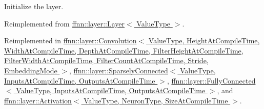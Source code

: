 Initialize the layer. 



Reimplemented from \hyperlink{classffnn_1_1layer_1_1_layer_ae8a7daa81382a7965b8ab8861da7e522}{ffnn\-::layer\-::\-Layer$<$ Value\-Type $>$}.



Reimplemented in \hyperlink{classffnn_1_1layer_1_1_convolution_a158af9a753113ac55730abd7b56b8684}{ffnn\-::layer\-::\-Convolution$<$ Value\-Type, Height\-At\-Compile\-Time, Width\-At\-Compile\-Time, Depth\-At\-Compile\-Time, Filter\-Height\-At\-Compile\-Time, Filter\-Width\-At\-Compile\-Time, Filter\-Count\-At\-Compile\-Time, Stride, Embedding\-Mode $>$}, \hyperlink{classffnn_1_1layer_1_1_sparsely_connected_abb2966b5e7813c43ae2ea5448188a9fb}{ffnn\-::layer\-::\-Sparsely\-Connected$<$ Value\-Type, Inputs\-At\-Compile\-Time, Outputs\-At\-Compile\-Time $>$}, \hyperlink{classffnn_1_1layer_1_1_fully_connected_aec414194202f845b866b0e8b2a51235c}{ffnn\-::layer\-::\-Fully\-Connected$<$ Value\-Type, Inputs\-At\-Compile\-Time, Outputs\-At\-Compile\-Time $>$}, and \hyperlink{classffnn_1_1layer_1_1_activation_ae73ef2d36d9c5ce3c219f6a51cba3c35}{ffnn\-::layer\-::\-Activation$<$ Value\-Type, Neuron\-Type, Size\-At\-Compile\-Time $>$}.

